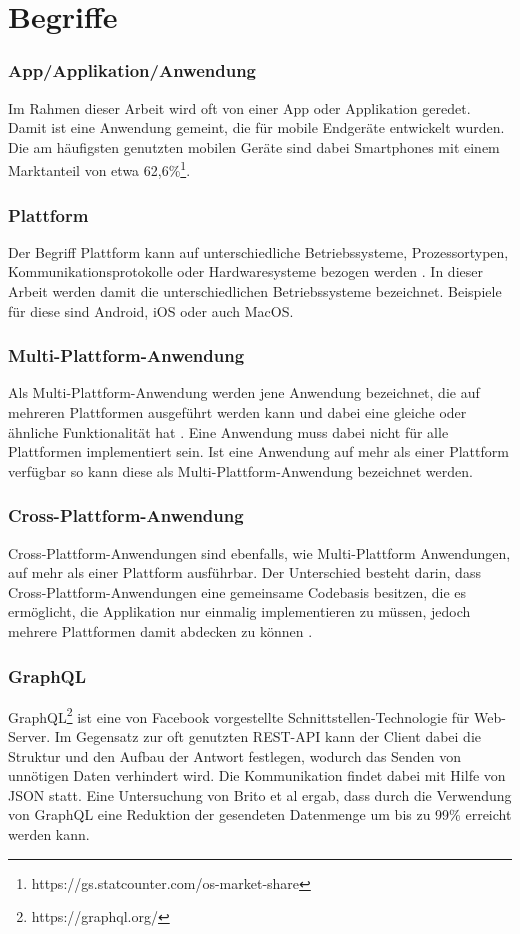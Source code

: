 \section{Begriffe}
\subsubsection{App/Applikation/Anwendung}
Im Rahmen dieser Arbeit wird oft von einer App oder Applikation geredet. Damit ist eine Anwendung gemeint, die für mobile Endgeräte entwickelt wurden. Die am häufigsten genutzten mobilen Geräte sind dabei Smartphones mit einem Marktanteil von etwa 62,6\%\footnote{https://gs.statcounter.com/os-market-share}.

\subsubsection{Plattform}
Der Begriff Plattform kann auf unterschiedliche Betriebssysteme, Prozessortypen, Kommunikationsprotokolle oder Hardwaresysteme bezogen werden \cite{2014Mulit_plattform_definition}. In dieser Arbeit werden damit die unterschiedlichen Betriebssysteme bezeichnet. Beispiele für diese sind Android, iOS oder auch MacOS.

\subsubsection{Multi-Plattform-Anwendung}
Als Multi-Plattform-Anwendung werden jene Anwendung bezeichnet, die auf mehreren Plattformen ausgeführt werden kann und dabei eine gleiche oder ähnliche Funktionalität hat \cite{2014Mulit_plattform_definition}. Eine Anwendung muss dabei nicht für alle Plattformen implementiert sein. Ist eine Anwendung auf mehr als einer Plattform verfügbar so kann diese als Multi-Plattform-Anwendung bezeichnet werden.

\subsubsection{Cross-Plattform-Anwendung}
Cross-Plattform-Anwendungen sind ebenfalls, wie Multi-Plattform Anwendungen, auf mehr als einer Plattform ausführbar. Der Unterschied besteht darin, dass Cross-Plattform-Anwendungen eine gemeinsame Codebasis besitzen, die es ermöglicht, die Applikation nur einmalig implementieren zu müssen, jedoch mehrere Plattformen damit abdecken zu können \cite{2014_Cross_plattform}.

\subsubsection{GraphQL}
GraphQL\footnote{https://graphql.org/} ist eine von Facebook vorgestellte Schnittstellen-Technologie für Web-Server. Im Gegensatz zur oft genutzten REST-API kann der Client dabei die Struktur und den Aufbau der Antwort festlegen, wodurch das Senden von unnötigen Daten verhindert wird. Die Kommunikation findet dabei mit Hilfe von JSON statt. Eine Untersuchung von Brito et al \cite{IEEE_GraphQL} ergab, dass durch die Verwendung von GraphQL eine Reduktion der gesendeten Datenmenge um bis zu 99\% erreicht werden kann. 